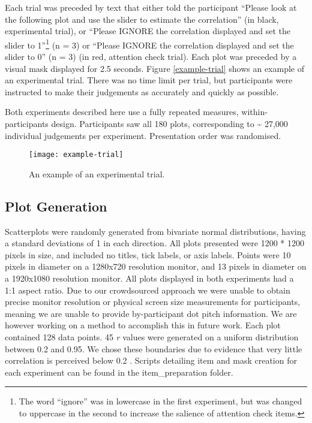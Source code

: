 \documentclass[preprint, 3p,
authoryear]{elsarticle} %
\begin{document}
Each trial was preceded by text that either told the participant
``Please look at the following plot and use the slider to estimate the
correlation'' (in black, experimental trial), or ``Please IGNORE the
correlation displayed and set the slider to 1''\footnote{The word
  ``ignore'' was in lowercase in the first experiment, but was changed
  to uppercase in the second to increase the salience of attention check
  items.} (n = 3) or ``Please IGNORE the correlation displayed and set
the slider to 0'' (n = 3) (in red, attention check trial). Each plot was
preceded by a visual mask displayed for 2.5 seconds. Figure
\ref{example-trial} shows an example of an experimental trial. There was
no time limit per trial, but participants were instructed to make their
judgements as accurately and quickly as possible.

Both experiments described here use a fully repeated measures,
within-participants design. Participants saw all 180 plots,
corresponding to \textasciitilde{} 27,000 individual judgements per
experiment. Presentation order was randomised.

\begin{figure}

\texttt{[image: example-trial]} \hfill{}

\caption{\label{example-trial}An example of an experimental trial.}\label{fig:example-trial}
\end{figure}

\hypertarget{plot-generation}{%
\subsection{Plot Generation}\label{plot-generation}}

Scatterplots were randomly generated from bivariate normal
distributions, having a standard deviations of 1 in each direction. All
plots presented were 1200 * 1200 pixels in size, and included no titles,
tick labels, or axis labels. Points were 10 pixels in diameter on a
1280x720 resolution monitor, and 13 pixels in diameter on a 1920x1080
resolution monitor. All plots displayed in both experiments had a 1:1
aspect ratio. Due to our crowdsourced approach we were unable to obtain
precise monitor resolution or physical screen size measurements for
participants, meaning we are unable to provide by-participant dot pitch
information. We are however working on a method to accomplish this in
future work. Each plot contained 128 data points. 45 \emph{r} values
were generated on a uniform distribution between 0.2 and 0.95. We chose
these boundaries due to evidence that very little correlation is
perceived below 0.2 \citep{bobko_1979, cleveland_1982, strahan_1978}.
Scripts detailing item and mask creation for each experiment can be
found in the item\_preparation folder.
\end{document}
